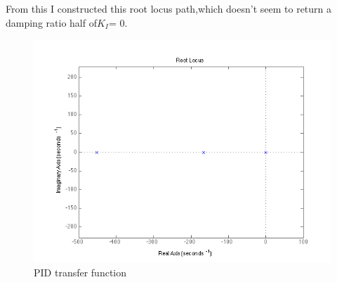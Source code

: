 \documentclass[english]{article}
\begin{document}
From this I constructed this root locus path,which doesn't seem to return a damping ratio half of$ K_I $= 0. 
\begin{figure}[h!]
\includegraphics[width = \linewidth]{faildr.png}
\caption{PID transfer function}
\end{figure}
\FloatBarrier 
\end{document}
